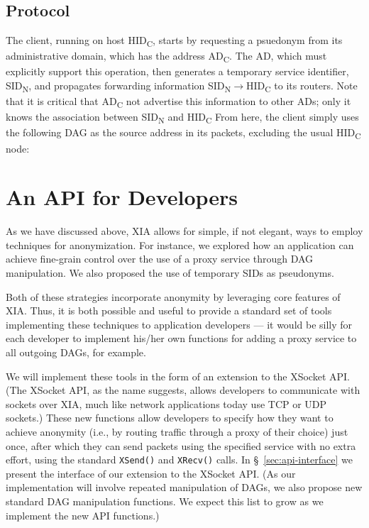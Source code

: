 \documentclass[11pt]{article}
\newcommand{\entrynode}[1]{
  \SetVertexNormal[Shape      = circle,
                   FillColor  = black,
                   LineWidth  = 0pt,
                   MinSize    = 0pt]
  \Vertex[L={\tiny\,}]{#1}
  \SetVertexNormal[Shape      = circle,
                   FillColor  = white,
                   LineWidth  = 2pt]
}
\begin{document}
\subsection{Protocol}

The client, running on host HID\textsubscript{C}, starts by requesting a psuedonym from its administrative domain, which has the address AD\textsubscript{C}.  The AD, which must explicitly support this operation, then generates a temporary service identifier, SID\textsubscript{N}, and propagates forwarding information SID\textsubscript{N}$\rightarrow$HID\textsubscript{C} to its routers. Note that it is critical that AD\textsubscript{C} not advertise this information to other ADs; only it knows the association between SID\textsubscript{N} and HID\textsubscript{C} From here, the client simply uses the following DAG as the source address in its packets, excluding the usual HID\textsubscript{C} node:

\begin{center}
\end{center}

\section{An API for Developers}
As we have discussed above, XIA allows for simple, if not elegant, ways to employ techniques for anonymization. For instance, we explored how an application can achieve fine-grain control over the use of a proxy service through DAG manipulation. We also proposed the use of temporary SIDs as pseudonyms.

Both of these strategies incorporate anonymity by leveraging core features of XIA. Thus, it is both possible and useful to provide a standard set of tools implementing these techniques to application developers --- it would be silly for each developer to implement his/her own functions for adding a proxy service to all outgoing DAGs, for example.

We will implement these tools in the form of an extension to the XSocket API. (The XSocket API, as the name suggests, allows developers to communicate with sockets over XIA, much like network applications today use TCP or UDP sockets.) These new functions allow developers to specify how they want to achieve anonymity (i.e., by routing traffic through a proxy of their choice) just once, after which they can send packets using the specified service with no extra effort, using the standard \texttt{XSend()} and \texttt{XRecv()} calls. In \S~\ref{sec:api-interface} we present the interface of our extension to the XSocket API. (As our implementation will involve repeated manipulation of DAGs, we also propose new standard DAG manipulation functions. We expect this list to grow as we implement the new API functions.)
\end{document}
